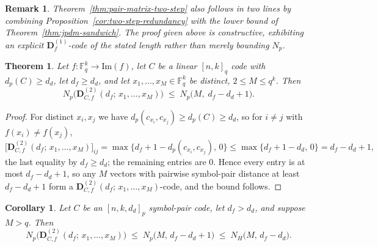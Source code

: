 \documentclass[11pt,draftclsnofoot,journal,onecolumn]{IEEEtran}
\newtheorem{theorem}{Theorem}
\newtheorem{corollary}{Corollary}
\newtheorem{remark}{Remark}
\begin{document}
    \begin{remark}
    Theorem~\ref{thm:pair-matrix-two-step} also follows in two lines by combining Proposition~\ref{cor:two-step-redundancy} with the lower bound of Theorem~\ref{thm:jpdm-sandwich}. The proof given above is constructive, exhibiting an explicit $\boldsymbol{D}^{(1)}_{f}$-code of the stated length rather than merely bounding $N_p$.
    \end{remark}


    \begin{theorem}
    \label{thm:coded-drm-bound}
    Let $f : \mathbb{F}_q^{k} \to \mathrm{Im}(f)$, let $C$ be a linear $[n,k]_q$ code with $d_p(C) \ge d_d$, let $d_f \ge d_d$, and let $x_1,\dots,x_M \in \mathbb{F}_q^{k}$ be distinct, $2 \le M \le q^k$. Then
    \[
    N_p\bigl(\boldsymbol{D}^{(2)}_{C,f}(d_f;\, x_1,\dots,x_M)\bigr)
    \;\le\; N_p\bigl(M,\; d_f - d_d + 1\bigr).
    \]
    \end{theorem}

    \begin{proof}
    For distinct $x_i, x_j$ we have $d_p(c_{x_i},c_{x_j}) \ge d_p(C) \ge d_d$, so for $i \neq j$ with $f(x_i) \neq f(x_j)$,
    \[
    \bigl[\boldsymbol{D}^{(2)}_{C,f}(d_f;\, x_1,\dots,x_M)\bigr]_{ij}
    = \max\bigl\{ d_f + 1 - d_p(c_{x_i},c_{x_j}),\, 0 \bigr\}
    \le \max\bigl\{ d_f + 1 - d_d,\, 0 \bigr\}
    = d_f - d_d + 1,
    \]
    the last equality by $d_f \ge d_d$; the remaining entries are $0$. Hence every entry is at most $d_f - d_d + 1$, so any $M$ vectors with pairwise symbol-pair distance at least $d_f - d_d + 1$ form a $\boldsymbol{D}^{(2)}_{C,f}(d_f;\,x_1,\dots,x_M)$-code, and the bound follows.
    \end{proof}

    

    

    \begin{corollary}
    \label{cor:coded-drm-hamming}
    Let $C$ be an $[n,k,d_d]_p$ symbol-pair code, let $d_f>d_d$, and suppose $M>q$. Then
    \[
    N_p\bigl(\boldsymbol{D}^{(2)}_{C,f}(d_f;\, x_1,\dots,x_M)\bigr)
    \;\le\; N_p\bigl(M,\, d_f - d_d + 1\bigr)
    \;\le\; N_H\bigl(M,\, d_f - d_d\bigr).
    \]
    \end{corollary}
\end{document}
